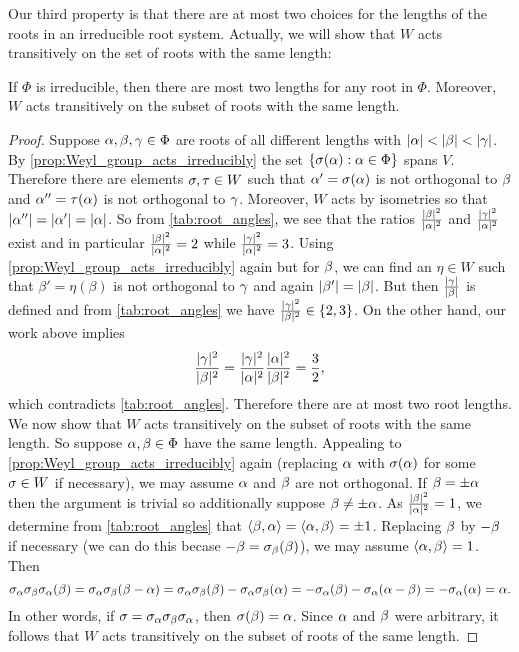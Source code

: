 \documentclass[12pt,reqno,oneside]{amsart}
\begin{document}
    Our third property is that there are at most two choices for the lengths of the roots in an irreducible root system. Actually, we will show that $W$ acts transitively on the set of roots with the same length:

    \begin{proposition}\label{prop:two_root_lengths}
        If $\Phi$ is irreducible, then there are most two lengths for any root in $\Phi$. Moreover, $W$ acts transitively on the subset of roots with the same length.
    \end{proposition}
    \begin{proof}
        Suppose $\alpha,\beta,\gamma \in \Phi$ are roots of all different lengths with $|\alpha| < |\beta| < |\gamma|$. By \cref{prop:Weyl_group_acts_irreducibly} the set $\{\sigma(\alpha):\alpha \in \Phi\}$ spans $V$. Therefore there are elements $\sigma,\tau \in W$ such that $\alpha' = \sigma(\alpha)$ is not orthogonal to $\beta$ and $\alpha'' = \tau(\alpha)$ is not orthogonal to $\gamma$. Moreover, $W$ acts by isometries so that $|\alpha''| = |\alpha'| = |\alpha|$. So from \cref{tab:root_angles}, we see that the ratios $\frac{|\beta|^{2}}{|\alpha|^{2}}$ and $\frac{|\gamma|^{2}}{|\alpha|^{2}}$ exist and in particular $\frac{|\beta|^{2}}{|\alpha|^{2}} = 2$ while $\frac{|\gamma|^{2}}{|\alpha|^{2}} = 3$. Using \cref{prop:Weyl_group_acts_irreducibly} again but for $\beta$, we can find an $\eta \in W$ such that $\beta' = \eta(\beta)$ is not orthogonal to $\gamma$ and again $|\beta'| = |\beta|$. But then $\frac{|\gamma|}{|\beta|}$ is defined and from \cref{tab:root_angles} we have $\frac{|\gamma|^{2}}{|\beta|^{2}} \in \left\{2,3\right\}$. On the other hand, our work above implies
        \[
            \frac{|\gamma|^{2}}{|\beta|^{2}} = \frac{|\gamma|^{2}}{|\alpha|^{2}}\frac{|\alpha|^{2}}{|\beta|^{2}} = \frac{3}{2},
        \]
        which contradicts \cref{tab:root_angles}. Therefore there are at most two root lengths. We now show that $W$ acts transitively on the subset of roots with the same length. So suppose $\alpha,\beta \in \Phi$ have the same length. Appealing to \cref{prop:Weyl_group_acts_irreducibly} again (replacing $\alpha$ with $\sigma(\alpha)$ for some $\sigma \in W$ if necessary), we may assume $\alpha$ and $\beta$ are not orthogonal. If $\beta = \pm \alpha$ then the argument is trivial so additionally suppose $\beta \neq \pm\alpha$. As $\frac{|\beta|^{2}}{|\alpha|^{2}} = 1$, we determine from \cref{tab:root_angles} that $\langle\beta,\alpha\rangle = \langle\alpha,\beta\rangle = \pm 1$. Replacing $\beta$ by $-\beta$ if necessary (we can do this becase $-\beta = \sigma_{\beta}(\beta)$), we may assume $\langle\alpha,\beta\rangle = 1$. Then
        \[
            \sigma_{\alpha}\sigma_{\beta}\sigma_{\alpha}(\beta) = \sigma_{\alpha}\sigma_{\beta}(\beta-\alpha) = \sigma_{\alpha}\sigma_{\beta}(\beta)-\sigma_{\alpha}\sigma_{\beta}(\alpha) = -\sigma_{\alpha}(\beta)-\sigma_{\alpha}(\alpha-\beta) = -\sigma_{\alpha}(\alpha) = \alpha.
        \]
        In other words, if $\sigma = \sigma_{\alpha}\sigma_{\beta}\sigma_{\alpha}$, then $\sigma(\beta) = \alpha$. Since $\alpha$ and $\beta$ were arbitrary, it follows that $W$ acts transitively on the subset of roots of the same length.
    \end{proof}
\end{document}
